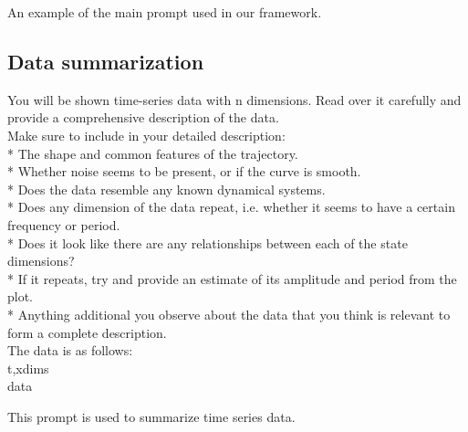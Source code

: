 \documentclass{article}
\begin{document}
\begin{prompt}[H]
\begin{tcolorbox}[promptbox, width=\textwidth]
\end{tcolorbox}
\caption{An example of the main prompt used in our framework.}
\label{prompt:main}
\end{prompt}


\subsection{Data summarization}

\begin{prompt}[H]
\begin{tcolorbox}[promptbox, width=\textwidth]
\small
You will be shown time-series data with {n} dimension{s}.
Read over it carefully and provide a comprehensive description of the data.\\
Make sure to include in your detailed description:\\
* The shape and common features of the trajectory.\\
* Whether noise seems to be present, or if the curve is smooth.\\
* Does the data resemble any known dynamical systems.\\
* Does any dimension of the data repeat, i.e. whether it seems to have a certain frequency or period.\\
* Does it look like there are any relationships between each of the state dimensions?\\
* If it repeats, try and provide an estimate of its amplitude and period from the plot.\\
* Anything additional you observe about the data that you think is relevant to form a complete description.\\
The data is as follows:\\
t,{xdims}\\
{data}\\
\end{tcolorbox}
\caption{This prompt is used to summarize time series data.}
\label{prompt:datasum}
\end{prompt}
\end{document}
